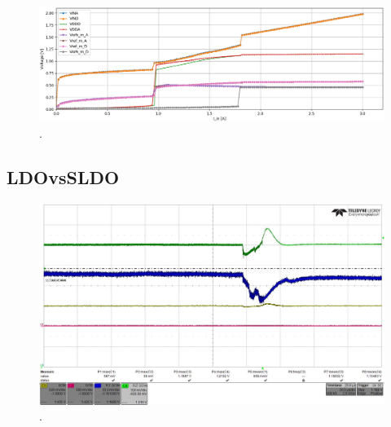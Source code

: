 \begin{figure}
\centering
\includegraphics[scale=.3]{Immagini/PUI}
\caption{.}
\label{PUI}
\end{figure}





\afterpage{\clearpage}

\subsection{LDOvsSLDO}

\begin{figure}
\centering
\includegraphics[scale=.3]{Immagini/alllin1}
\caption{.}
\label{alllin1}
\end{figure}



